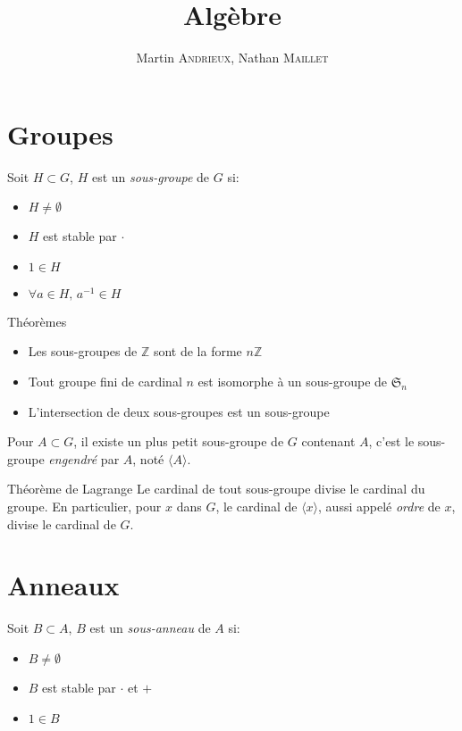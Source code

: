 \documentclass[french, a4paper, 11pt, twocolumn]{article}
\title{Algèbre}
\author{Martin \textsc{Andrieux}, Nathan \textsc{Maillet}}
\date{}
\newcommand{\Z}{\mathbb{Z}}   %
\begin{document}
\maketitle

\section{Groupes}
\begin{definition}
  Soit \(H\subset G\), \(H\) est un \emph{sous-groupe} de \(G\) si:
  \begin{itemize}[label=\(\bullet\)]
    \item \(H\neq\emptyset\)
    \item \(H\) est stable par \(\cdot\)
    \item \(1\in H\)
    \item \(\forall a \in H,\, a^{-1}\in H\)
  \end{itemize}
\end{definition}

\begin{theoreme}{Théorèmes}
  \begin{itemize}[label=\(\bullet\)]
    \item Les sous-groupes de \(\Z\) sont de la forme \(n\Z\)
    \item Tout groupe fini de cardinal \(n\) est isomorphe à un sous-groupe de \(\mathfrak S_{n}\)
    \item L'intersection de deux sous-groupes est un sous-groupe
  \end{itemize}
\end{theoreme}

\begin{definition}
  Pour \(A\subset G\), il existe un plus petit sous-groupe de \(G\) contenant \(A\), c'est le sous-groupe \emph{engendré} par \(A\), noté \(\langle A\rangle\).
\end{definition}

\begin{theoreme}{Théorème de Lagrange}
  Le cardinal de tout sous-groupe divise le cardinal du groupe.
  \tcblower
  En particulier, pour \(x\) dans \(G\), le cardinal de \(\langle x \rangle\), aussi appelé \emph{ordre} de \(x\), divise le cardinal de \(G\).
\end{theoreme}

\section{Anneaux}
\begin{definition}
  Soit \(B\subset A\), \(B\) est un \emph{sous-anneau} de \(A\) si:
  \begin{itemize}[label=\(\bullet\)]
    \item \(B\neq\emptyset\)
    \item \(B\) est stable par \(\cdot\) et \(+\)
    \item \(1\in B\)
  \end{itemize}
\end{definition}
\end{document}
